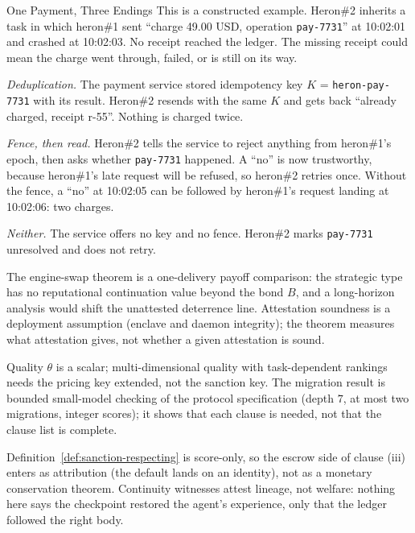 \documentclass[11pt,a4paper]{article}
\theoremstyle{definition}
\newcounter{protocol}[section]
\begin{document}
\begin{pdexample}{One Payment, Three Endings}
\setlength{\parskip}{4pt plus 1pt}
\label{ex:stp-unknown-payment}
This is a constructed example. Heron\#2 inherits a task in which heron\#1 sent
``charge 49.00 USD, operation \texttt{pay-7731}'' at 10:02:01 and
crashed at 10:02:03. No receipt reached the ledger. The missing receipt could
mean the charge went through, failed, or is still on its way.

\emph{Deduplication.} The payment service stored idempotency key
$K$ = \texttt{heron-pay-7731} with its result. Heron\#2 resends with the same
$K$ and gets back ``already charged, receipt r-55''. Nothing is charged twice.

\emph{Fence, then read.} Heron\#2 tells the service to reject anything from
heron\#1's epoch, then asks whether \texttt{pay-7731} happened. A ``no'' is now
trustworthy, because heron\#1's late request will be refused, so heron\#2
retries once. Without the fence, a ``no'' at 10:02:05 can be followed by
heron\#1's request landing at 10:02:06: two charges.

\emph{Neither.} The service offers no key and no fence. Heron\#2 marks
\texttt{pay-7731} unresolved and does not retry.
\end{pdexample}

\begin{pdboundary}
\setlength{\parskip}{4pt plus 1pt}
The engine-swap theorem is a one-delivery payoff comparison: the strategic type has no
reputational continuation value beyond the bond $B$, and a long-horizon
analysis would shift the unattested deterrence line. Attestation soundness is
a deployment \mbox{assumption} (enclave and daemon integrity); the theorem
measures what attestation gives, not whether a given attestation is sound.

Quality
$\theta$ is a scalar; multi-dimensional quality with task-dependent rankings
needs the pricing key extended, not the sanction key. The migration result is
bounded small-model checking of the protocol specification (depth $7$, at
most two migrations, integer scores); it shows that each clause is needed, not
that the clause list is complete.


Definition~\ref{def:sanction-respecting} is score-only, so the escrow side of
clause (iii) enters as attribution (the default lands on an identity), not as
a monetary conservation theorem. Continuity witnesses attest \mbox{lineage}, not
welfare: nothing here says the checkpoint restored the agent's experience,
only that the ledger followed the right body.
\end{pdboundary}
\end{document}
